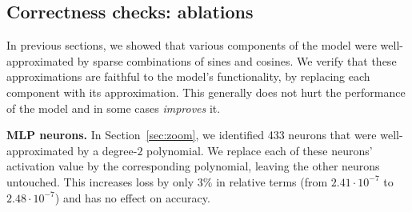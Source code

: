 \documentclass{article} %
\begin{document}
\subsection{Correctness checks: ablations}
\label{sec:ablation}
In previous sections, we showed that various components of the model were well-approximated by sparse combinations of sines and cosines. We verify that these approximations are faithful to the model's functionality, by replacing each component with its approximation. This generally does not hurt the performance of the model and in some cases \emph{improves} it.

\textbf{MLP neurons.} In Section~\ref{sec:zoom}, we identified 433 neurons that were well-approximated by a degree-$2$ polynomial. We replace each of these neurons' activation value by the corresponding polynomial, leaving the other neurons untouched. This increases loss by only $3 \% $ in relative terms (from $2.41 \cdot 10^{-7}$ to $2.48 \cdot 10^{-7}$) and has no effect on accuracy. 

    
    
\end{document}
